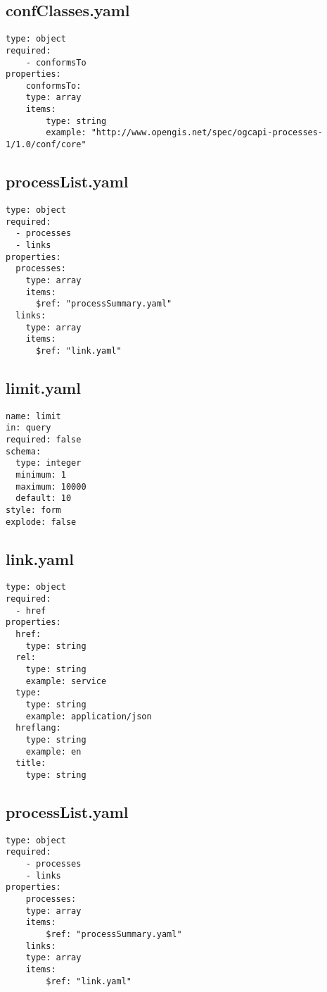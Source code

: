 \subsection{confClasses.yaml}
\begin{lstlisting}[caption={confClasses.yaml}, style = JSON]
type: object
required:
    - conformsTo
properties:
    conformsTo:
    type: array
    items:
        type: string
        example: "http://www.opengis.net/spec/ogcapi-processes-1/1.0/conf/core"
\end{lstlisting}\label{SchemaConfClassesyaml}  

\subsection{processList.yaml}
\begin{lstlisting}[caption={processList.yaml}, style = JSON]
type: object
required:
  - processes
  - links
properties:
  processes:
    type: array
    items:
      $ref: "processSummary.yaml"
  links:
    type: array
    items:
      $ref: "link.yaml"
\end{lstlisting}\label{SchemaProcessListyaml}  

\subsection{limit.yaml}
\begin{lstlisting}[caption={limit.yaml}, style = JSON]
name: limit
in: query
required: false
schema:
  type: integer
  minimum: 1
  maximum: 10000
  default: 10
style: form
explode: false
\end{lstlisting}\label{SchemaLimityaml}  

\subsection{link.yaml}
\begin{lstlisting}[caption={link.yaml}, style = JSON]
type: object
required:
  - href
properties:
  href:
    type: string
  rel:
    type: string
    example: service
  type:
    type: string
    example: application/json
  hreflang:
    type: string
    example: en
  title:
    type: string
\end{lstlisting}\label{SchemaLinkyaml}  

\subsection{processList.yaml}
\begin{lstlisting}[caption={processList.yaml}, style = JSON]
type: object
required:
    - processes
    - links
properties:
    processes:
    type: array
    items:
        $ref: "processSummary.yaml"
    links:
    type: array
    items:
        $ref: "link.yaml"
\end{lstlisting}\label{SchemaProcessListyaml}  

